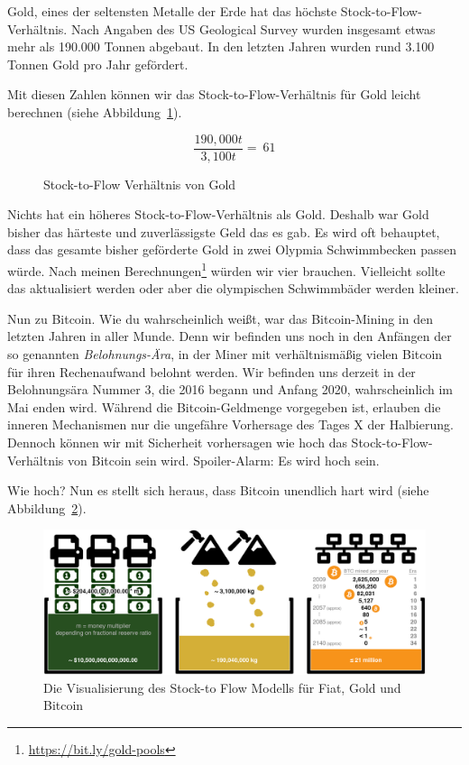 Gold, eines der seltensten Metalle der Erde hat das höchste
Stock-to-Flow-Verhältnis. Nach Angaben des US Geological Survey wurden insgesamt
etwas mehr als 190.000 Tonnen abgebaut. In den letzten Jahren wurden rund 3.100
Tonnen Gold pro Jahr gefördert.~\cite{mineral-commodity-summaries}

Mit diesen Zahlen können wir das Stock-to-Flow-Verhältnis für Gold leicht
berechnen (siehe Abbildung~\ref{fig:stock-to-flow-gold}).

\begin{figure}
  \centering
  \begin{equation}
  \frac{190,000 t}{3,100 t} = ~ 61
  \end{equation}
  \caption{Stock-to-Flow Verhältnis von Gold}
  \label{fig:stock-to-flow-gold}
\end{figure}

Nichts hat ein höheres Stock-to-Flow-Verhältnis als Gold. Deshalb war Gold
bisher das härteste und zuverlässigste Geld das es gab. Es wird oft behauptet,
dass das gesamte bisher geförderte Gold in zwei Olypmia Schwimmbecken passen
würde. Nach meinen Berechnungen\footnote{\url{https://bit.ly/gold-pools}} würden
wir vier brauchen. Vielleicht sollte das aktualisiert werden oder aber die
olympischen Schwimmbäder werden kleiner.

Nun zu Bitcoin. Wie du wahrscheinlich weißt, war das Bitcoin-Mining in den
letzten Jahren in aller Munde. Denn wir befinden uns noch in den Anfängen der so
genannten \textit{Belohnungs-Ära}, in der Miner mit verhältnismäßig vielen
Bitcoin für ihren Rechenaufwand belohnt werden. Wir befinden uns derzeit in der
Belohnungsära Nummer 3, die 2016 begann und Anfang 2020, wahrscheinlich im Mai
enden wird. Während die Bitcoin-Geldmenge vorgegeben ist, erlauben die inneren
Mechanismen nur die ungefähre Vorhersage des Tages X der Halbierung. Dennoch
können wir mit Sicherheit vorhersagen wie hoch das Stock-to-Flow-Verhältnis von
Bitcoin sein wird. Spoiler-Alarm: Es wird hoch sein.

Wie hoch? Nun es stellt sich heraus, dass Bitcoin unendlich hart wird (siehe
Abbildung~\ref{fig:stock-to-flow-white-cropped}).

\begin{figure}
  \includegraphics{assets/images/stock-to-flow-white-cropped.png}
  \caption{Die Visualisierung des Stock-to Flow Modells für Fiat, Gold und Bitcoin}
  \label{fig:stock-to-flow-white-cropped}
\end{figure}

